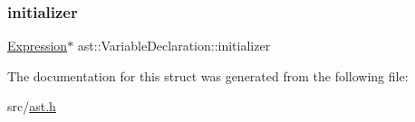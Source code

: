 \subsubsection{\texorpdfstring{initializer}{initializer}}
{\footnotesize\ttfamily \hyperlink{structast_1_1_expression}{Expression}$\ast$ ast\+::\+Variable\+Declaration\+::initializer}



The documentation for this struct was generated from the following file\+:\begin{DoxyCompactItemize}
\item 
src/\hyperlink{ast_8h}{ast.\+h}\end{DoxyCompactItemize}
